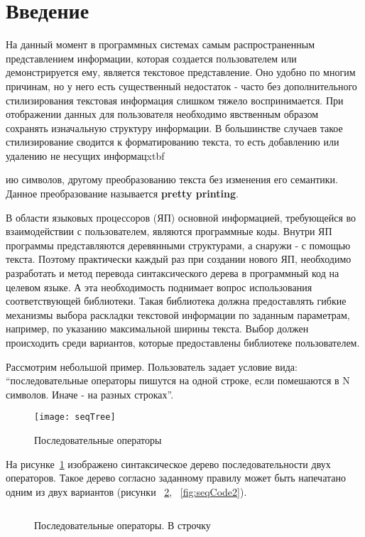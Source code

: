 \newpage

\section*{Введение}

На данный момент в программных системах самым распространенным представлением информации, которая создается пользователем или демонстрируется ему, является текстовое представление. Оно удобно по многим причинам, но у него есть существенный недостаток - часто без дополнительного стилизирования текстовая информация слишком тяжело воспринимается. При отображении данных для пользователя необходимо явственным образом сохранять изначальную структуру информации. В большинстве случаев такое стилизирование сводится к форматированию текста, то есть добавлению или удалению не несущих информацxtbf{ию символов, другому преобразованию текста без изменения его семантики. Данное преобразование называется \textbf{pretty printing}.

В области языковых процессоров (ЯП) основной информацией, требующейся во взаимодействии с пользователем, являются программные коды. Внутри ЯП программы представляются деревянными структурами, а снаружи - с помощью текста. Поэтому практически каждый раз при создании нового ЯП, необходимо разработать и метод перевода синтаксического дерева в программный код на целевом языке. А эта необходимость поднимает вопрос использования соответствующей библиотеки. Такая библиотека должна предоставлять гибкие механизмы выбора раскладки текстовой информации по заданным параметрам, например, по указанию максимальной ширины текста. Выбор должен происходить среди вариантов, которые предоставлены библиотеке пользователем.

Рассмотрим небольшой пример. Пользователь задает условие вида: “последовательные операторы пишутся на одной строке, если помешаются в N символов. Иначе - на разных строках”.


\begin{figure}[h]
\centering
\texttt{[image: seqTree]}
\caption{Последовательные операторы}
\label{fig:seqImage}
\end{figure}

На рисунке~\ref{fig:seqImage} изображено синтаксическое дерево последовательности двух операторов. Такое дерево согласно заданному правилу может быть напечатано одним из двух вариантов (рисунки ~\ref{fig:seqCode1}, ~\ref{fig:seqCode2}).

\begin{figure}[h]
\inputminted{c}{codes/seqCode1.java}
\caption{Последовательные операторы. В строчку}
\label{fig:seqCode1}
\end{figure}

}
